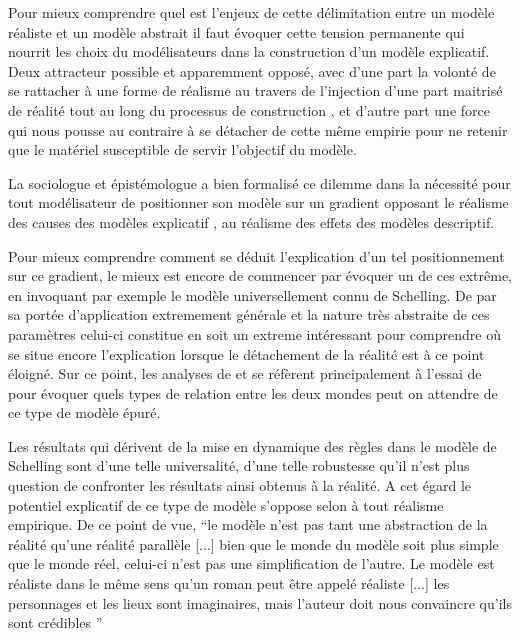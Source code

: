 
Pour mieux comprendre quel est l'enjeux de cette délimitation entre un modèle réaliste et un modèle abstrait il faut évoquer cette tension permanente qui nourrit les choix du modélisateurs dans la construction d'un modèle explicatif. Deux attracteur possible et apparemment opposé, avec d'une part la volonté de se rattacher à une forme de réalisme au travers de l'injection d'une part maitrisé de réalité tout au long du processus de construction , et d'autre part une force qui nous pousse au contraire à se détacher de cette même empirie pour ne retenir que le matériel susceptible de servir l'objectif du modèle.

La sociologue et épistémologue \textcite{Bulle2005} a bien formalisé ce dilemme dans la nécessité pour tout modélisateur de positionner son modèle sur un gradient opposant le réalisme des causes des modèles explicatif , au réalisme des effets des modèles descriptif. 

Pour mieux comprendre comment se déduit l'explication d'un tel positionnement sur ce gradient, le mieux est encore de commencer par évoquer un de ces extrême, en invoquant par exemple le modèle universellement connu de Schelling. De par sa portée d'application extremement générale et la nature très abstraite de ces paramètres celui-ci constitue en soit un extreme intéressant pour comprendre où se situe encore l'explication lorsque le détachement de la réalité est à ce point éloigné. Sur ce point, les analyses de \textcite{Bulle2005} et \textcite{Phan2008, Phan2010} se réfèrent principalement à l'essai de \textcite{Sugden2002} pour évoquer quels types de relation entre les deux mondes peut on attendre de ce type de modèle épuré. 

Les résultats qui dérivent de la mise en dynamique des règles dans le modèle de Schelling sont d'une telle universalité, d'une telle robustesse qu'il n'est plus question de confronter les résultats ainsi obtenus à la réalité. A cet égard le potentiel explicatif de ce type de modèle s'oppose selon \textcite{Bulle2005} à tout réalisme empirique. De ce point de vue, \enquote{le modèle n'est pas tant une abstraction de la réalité qu’une réalité parallèle [...] bien que le monde du modèle soit plus simple que le monde réel, celui-ci n'est pas une simplification de l'autre. Le modèle est réaliste dans le même sens qu'un roman peut être appelé réaliste [...] les personnages et les lieux sont imaginaires, mais l'auteur doit nous convaincre qu'ils sont crédibles } \autocites[131]{Sugden2002}[10]{Phan2008}

